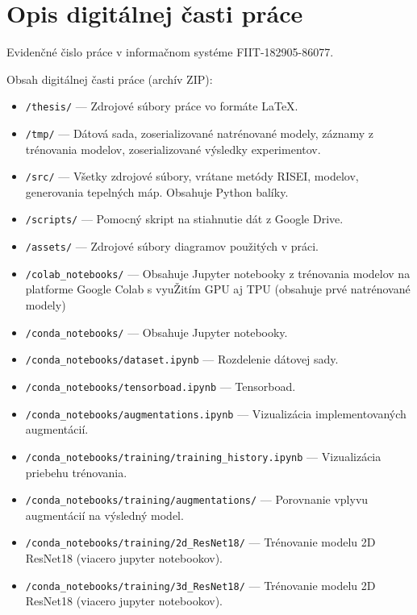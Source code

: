 \chapter{Opis digitálnej časti práce \label{cha:cdrom}}

\setcounter{page}{1}

Evidenčné čislo práce v informačnom systéme FIIT-182905-86077.

Obsah digitálnej časti práce (archív ZIP):

\begin{itemize}
    \item \texttt{/thesis/} --- Zdrojové súbory práce vo formáte \LaTeX.
    \item \texttt{/tmp/} --- Dátová sada, zoserializované natrénované modely, záznamy z trénovania modelov, zoserializované výsledky experimentov. 
    \item \texttt{/src/} --- Všetky zdrojové súbory, vrátane metódy RISEI, modelov, generovania tepelných máp. Obsahuje Python balíky.
    \item \texttt{/scripts/} --- Pomocný skript na stiahnutie dát z Google Drive.
    \item \texttt{/assets/} --- Zdrojové súbory diagramov použitých v práci. 
    \item \texttt{/colab\_notebooks/} --- Obsahuje Jupyter notebooky z trénovania modelov na platforme Google Colab s vyuŽitím GPU aj TPU (obsahuje prvé natrénované modely) 
    \item \texttt{/conda\_notebooks/} --- Obsahuje Jupyter notebooky.
    \item \texttt{/conda\_notebooks/dataset.ipynb} --- Rozdelenie dátovej sady.
    \item \texttt{/conda\_notebooks/tensorboad.ipynb} --- Tensorboad.
    \item \texttt{/conda\_notebooks/augmentations.ipynb} --- Vizualizácia implementovaných augmentácií.
    \item \texttt{/conda\_notebooks/training/training\_history.ipynb} --- Vizualizácia priebehu trénovania.
    \item \texttt{/conda\_notebooks/training/augmentations/} --- Porovnanie vplyvu augmentácií na výsledný model. 
    \item \texttt{/conda\_notebooks/training/2d\_ResNet18/} --- Trénovanie modelu 2D ResNet18 (viacero jupyter notebookov).
    \item \texttt{/conda\_notebooks/training/3d\_ResNet18/} --- Trénovanie modelu 2D ResNet18 (viacero jupyter notebookov).

\end{itemize}
